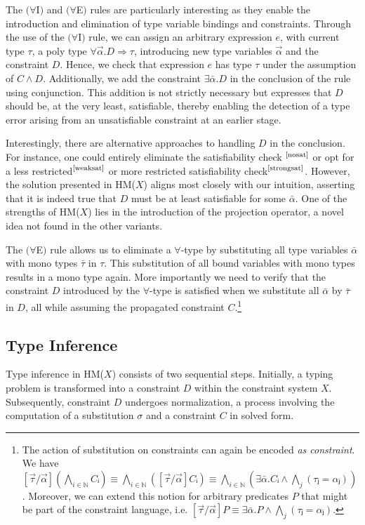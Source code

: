\documentclass[runningheads]{llncs}
\newcommand{\hmx}{HM($X$)}
\begin{document}
The $(∀$I$)$ and $(∀$E$)$ rules are particularly interesting as they
enable the introduction and elimination of type variable bindings and
constraints.
Through the use of the $(∀$I$)$ rule, we can assign an arbitrary
expression $e$, with current type $τ$, a poly type $∀ \Vec α.D ⇒ τ$,
introducing new type variables $\Vec α$ and the constraint $D$.
Hence, we check that expression $e$ has type $τ$ under the assumption of
$C ∧ D$.
Additionally, we add the constraint $∃\bar{α}. D$ in the conclusion of
the rule using conjunction.
This addition is not strictly necessary but expresses that $D$ should be,
at the very least, satisfiable, thereby enabling the detection of a type
error arising from an unsatisfiable constraint at an earlier stage.

Interestingly, there are alternative approaches to handling $D$ in the
conclusion. For instance, one could entirely eliminate the satisfiability check
$^\text{\cite{nosat}}$ or opt for a less restricted$^\text{\cite{weaksat}}$ or
more restricted satisfiability
check$^\text{\cite{strongsat}}$. However, the solution presented in \hmx{}
aligns most closely
with our intuition, asserting that it is indeed true that $D$ must be at least
satisfiable for some $\bar α$. One of the strengths of \hmx{} lies in the
introduction of the projection operator, a novel idea not found in the other
variants.

The $(∀$E$)$ rule allows us to eliminate a $∀$-type by substituting all
type variables $\bar{α}$ with mono types $\bar{τ}$ in $τ$. This substitution
of all bound variables with mono types results in a mono type again. More
importantly we need to verify that the constraint $D$ introduced by the
$∀$-type is satisfied when we substitute all $\bar{α}$ by $\bar{τ}$ in $D$, all
while assuming the propagated constraint $C$.\footnote{
The action of substitution on constraints can again be encoded
\emph{as constraint}.
We have $[\Vec τ / \Vec α] (⋀_{i ∈ ℕ} Cᵢ) ≡ ⋀_{i ∈ ℕ} ([\Vec τ / \Vec
      α]Cᵢ) ≡
  ⋀_{i ∈ ℕ} (∃\bar{α}. Cᵢ ∧ ⋀_{j}(τⱼ = αⱼ))$.
Moreover, we can extend this notion for arbitrary predicates $P$ that might be
part of the constraint language, i.e. $[\Vec τ / \Vec α]P ≡ ∃\bar{α}. P ∧
  ⋀_{j}(τⱼ = αⱼ)$.
}

\subsection{Type Inference}
Type inference in \hmx{} consists of two sequential steps. Initially, a
typing
problem is transformed into a constraint $D$ within the constraint system
$X$.
Subsequently, constraint $D$ undergoes normalization, a process involving
the
computation of a substitution $σ$ and a constraint $C$ in solved form.
\end{document}

